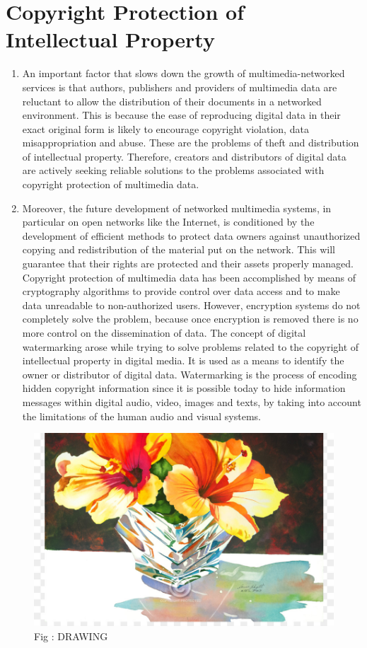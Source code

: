 \documentclass[12pt]{IEEEtran}
\begin{document}
\section{Copyright Protection of Intellectual Property}
\begin{enumerate}
\item An important factor that slows down the growth of multimedia-networked services is that authors, publishers and providers of multimedia data are reluctant to allow the distribution of their documents in a networked environment. This is because the ease of reproducing digital data in their exact original form is likely to encourage copyright violation, data misappropriation and abuse. These are the problems of theft and distribution of intellectual property. Therefore, creators and distributors of digital data are actively seeking reliable solutions to the problems associated with copyright protection of multimedia data.\\

\item Moreover, the future development of networked multimedia systems, in particular on open networks like the Internet, is conditioned by the development of efficient methods to protect data owners against unauthorized copying and redistribution of the material put on the network. This will guarantee that their rights are protected and their assets properly managed. Copyright protection of multimedia data has been accomplished by means of cryptography algorithms to provide control over data access and to make data unreadable to non-authorized users. However, encryption systems do not completely solve the problem, because once encryption is removed there is no more control on the dissemination of data. The concept of digital watermarking arose while trying to solve problems related to the copyright of intellectual property in digital media. It is used as a means to identify the owner or distributor of digital data. Watermarking is the process of encoding hidden copyright information since it is possible today to hide information messages within digital audio, video, images and texts, by taking into account the limitations of the human audio and visual systems.
\end{enumerate}
\centering
\begin{subfigure}{\linewidth}
\includegraphics[width=\linewidth]{china rose}
\caption{Fig : DRAWING }
\end{subfigure}
\end{document}
